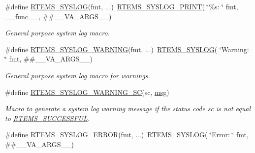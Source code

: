 \begin{DoxyCompactItemize}
\mbox{\label{group__rtems__status__checks_gaef4ebaf61bb2bf34d06967af636701c2}} 
\#define \mbox{\hyperlink{group__rtems__status__checks_gaef4ebaf61bb2bf34d06967af636701c2}{R\+T\+E\+M\+S\+\_\+\+S\+Y\+S\+L\+OG}}(fmt, ...)~\mbox{\hyperlink{group__rtems__status__checks_gae6366e5dd71c9ba9d8cd7d3688b2f6ef}{R\+T\+E\+M\+S\+\_\+\+S\+Y\+S\+L\+O\+G\+\_\+\+P\+R\+I\+NT}}( \char`\"{}\%s\+: \char`\"{} fmt, \+\_\+\+\_\+func\+\_\+\+\_\+, \#\#\+\_\+\+\_\+\+V\+A\+\_\+\+A\+R\+G\+S\+\_\+\+\_\+)
\begin{DoxyCompactList}\small\item\em General purpose system log macro. \end{DoxyCompactList}\item 
\mbox{\label{group__rtems__status__checks_gad55c5ed5bf61f5554c580e43104ee5af}} 
\#define \mbox{\hyperlink{group__rtems__status__checks_gad55c5ed5bf61f5554c580e43104ee5af}{R\+T\+E\+M\+S\+\_\+\+S\+Y\+S\+L\+O\+G\+\_\+\+W\+A\+R\+N\+I\+NG}}(fmt, ...)~\mbox{\hyperlink{group__rtems__status__checks_gaef4ebaf61bb2bf34d06967af636701c2}{R\+T\+E\+M\+S\+\_\+\+S\+Y\+S\+L\+OG}}( \char`\"{}Warning\+: \char`\"{} fmt, \#\#\+\_\+\+\_\+\+V\+A\+\_\+\+A\+R\+G\+S\+\_\+\+\_\+)
\begin{DoxyCompactList}\small\item\em General purpose system log macro for warnings. \end{DoxyCompactList}\item 
\#define \mbox{\hyperlink{group__rtems__status__checks_ga9cad738b200af0ab721806aab7f25b41}{R\+T\+E\+M\+S\+\_\+\+S\+Y\+S\+L\+O\+G\+\_\+\+W\+A\+R\+N\+I\+N\+G\+\_\+\+SC}}(sc,  \mbox{\hyperlink{structmsg}{msg}})
\begin{DoxyCompactList}\small\item\em Macro to generate a system log warning message if the status code {\itshape sc} is not equal to \mbox{\hyperlink{group__ClassicStatus_gga545d41846817eaba6143d52ee4d9e9fea8a23e2d94778f09399da984d73562536}{R\+T\+E\+M\+S\+\_\+\+S\+U\+C\+C\+E\+S\+S\+F\+UL}}. \end{DoxyCompactList}\item 
\mbox{\label{group__rtems__status__checks_ga297efcfefcb8a3bf4dec6585a4884136}} 
\#define \mbox{\hyperlink{group__rtems__status__checks_ga297efcfefcb8a3bf4dec6585a4884136}{R\+T\+E\+M\+S\+\_\+\+S\+Y\+S\+L\+O\+G\+\_\+\+E\+R\+R\+OR}}(fmt, ...)~\mbox{\hyperlink{group__rtems__status__checks_gaef4ebaf61bb2bf34d06967af636701c2}{R\+T\+E\+M\+S\+\_\+\+S\+Y\+S\+L\+OG}}( \char`\"{}Error\+: \char`\"{} fmt, \#\#\+\_\+\+\_\+\+V\+A\+\_\+\+A\+R\+G\+S\+\_\+\+\_\+)

\end{DoxyCompactItemize}
